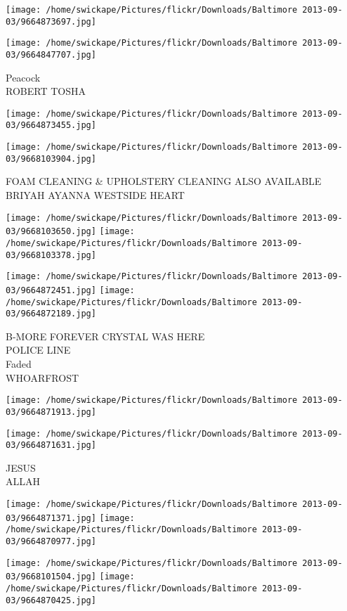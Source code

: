 \documentclass[10pt,letterpaper]{article}
\begin{document}
\texttt{[image: /home/swickape/Pictures/flickr/Downloads/Baltimore 2013-09-03/9664873697.jpg]}

\vspace{0.25in}
\texttt{[image: /home/swickape/Pictures/flickr/Downloads/Baltimore 2013-09-03/9664847707.jpg]}

Peacock\\
ROBERT TOSHA
\pagebreak

\texttt{[image: /home/swickape/Pictures/flickr/Downloads/Baltimore 2013-09-03/9664873455.jpg]}

\vspace{0.25in}
\texttt{[image: /home/swickape/Pictures/flickr/Downloads/Baltimore 2013-09-03/9668103904.jpg]}

FOAM CLEANING \& UPHOLSTERY CLEANING ALSO AVAILABLE\\
BRIYAH AYANNA WESTSIDE HEART
\pagebreak

\texttt{[image: /home/swickape/Pictures/flickr/Downloads/Baltimore 2013-09-03/9668103650.jpg]}
\texttt{[image: /home/swickape/Pictures/flickr/Downloads/Baltimore 2013-09-03/9668103378.jpg]}

\texttt{[image: /home/swickape/Pictures/flickr/Downloads/Baltimore 2013-09-03/9664872451.jpg]}
\texttt{[image: /home/swickape/Pictures/flickr/Downloads/Baltimore 2013-09-03/9664872189.jpg]}

B{-}MORE FOREVER CRYSTAL WAS HERE\\
POLICE LINE\\
Faded\\
WHOARFROST
\pagebreak

\texttt{[image: /home/swickape/Pictures/flickr/Downloads/Baltimore 2013-09-03/9664871913.jpg]}

\vspace{0.25in}
\texttt{[image: /home/swickape/Pictures/flickr/Downloads/Baltimore 2013-09-03/9664871631.jpg]}

JESUS\\
ALLAH
\pagebreak

\texttt{[image: /home/swickape/Pictures/flickr/Downloads/Baltimore 2013-09-03/9664871371.jpg]}
\texttt{[image: /home/swickape/Pictures/flickr/Downloads/Baltimore 2013-09-03/9664870977.jpg]}

\texttt{[image: /home/swickape/Pictures/flickr/Downloads/Baltimore 2013-09-03/9668101504.jpg]}
\texttt{[image: /home/swickape/Pictures/flickr/Downloads/Baltimore 2013-09-03/9664870425.jpg]}
\end{document}
